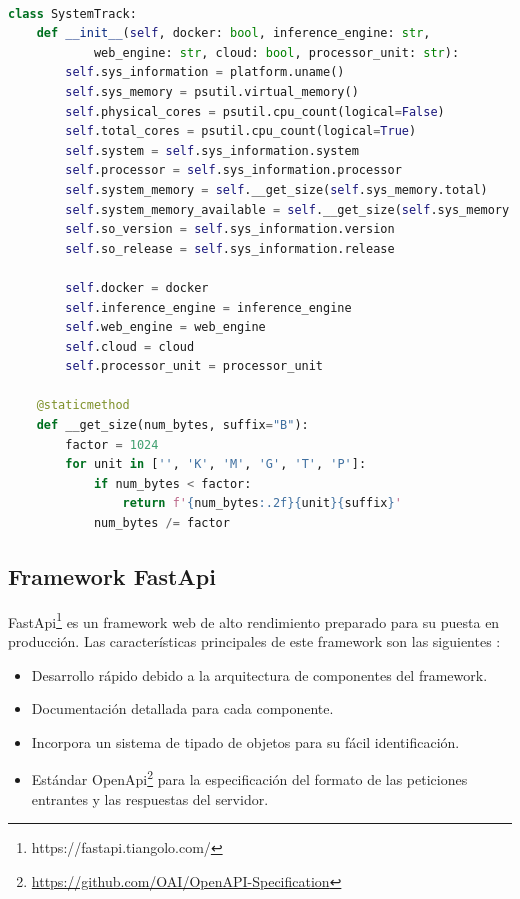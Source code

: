 \begin{lstlisting}[caption=Clase Python para generar información sobre el sistema.,
      label=d_label,
      language=Python,label={example4}]

class SystemTrack:
    def __init__(self, docker: bool, inference_engine: str,
            web_engine: str, cloud: bool, processor_unit: str):
        self.sys_information = platform.uname()
        self.sys_memory = psutil.virtual_memory()
        self.physical_cores = psutil.cpu_count(logical=False)
        self.total_cores = psutil.cpu_count(logical=True)
        self.system = self.sys_information.system
        self.processor = self.sys_information.processor
        self.system_memory = self.__get_size(self.sys_memory.total)
        self.system_memory_available = self.__get_size(self.sys_memory.available)
        self.so_version = self.sys_information.version
        self.so_release = self.sys_information.release

        self.docker = docker
        self.inference_engine = inference_engine
        self.web_engine = web_engine
        self.cloud = cloud
        self.processor_unit = processor_unit

    @staticmethod
    def __get_size(num_bytes, suffix="B"):
        factor = 1024
        for unit in ['', 'K', 'M', 'G', 'T', 'P']:
            if num_bytes < factor:
                return f'{num_bytes:.2f}{unit}{suffix}'
            num_bytes /= factor
\end{lstlisting}
\subsection{Framework FastApi}\label{subsec:framework-fastapi}
FastApi\footnote{https://fastapi.tiangolo.com/} es un framework web de alto rendimiento preparado para su puesta en producción.
Las características principales de este framework son las siguientes :

\begin{itemize}
    \item Desarrollo rápido debido a la arquitectura de componentes del framework.
    \item Documentación detallada para cada componente.
    \item Incorpora un sistema de tipado de objetos para su fácil identificación.
    \item Estándar OpenApi\footnote{\url{https://github.com/OAI/OpenAPI-Specification}} para la especificación del formato de las peticiones entrantes y las respuestas del servidor.
\end{itemize}

